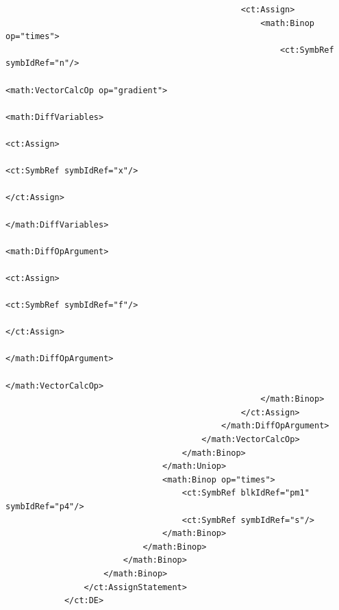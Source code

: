 \begin{lstlisting}
                                                <ct:Assign>
                                                    <math:Binop op="times">
                                                        <ct:SymbRef symbIdRef="n"/>
                                                        <math:VectorCalcOp op="gradient">
                                                            <math:DiffVariables>
                                                                <ct:Assign>
                                                                    <ct:SymbRef symbIdRef="x"/>
                                                                </ct:Assign>
                                                            </math:DiffVariables>
                                                            <math:DiffOpArgument>
                                                                <ct:Assign>
                                                                    <ct:SymbRef symbIdRef="f"/>
                                                                </ct:Assign>
                                                            </math:DiffOpArgument>
                                                        </math:VectorCalcOp>
                                                    </math:Binop>
                                                </ct:Assign>
                                            </math:DiffOpArgument>
                                        </math:VectorCalcOp>
                                    </math:Binop>
                                </math:Uniop>
                                <math:Binop op="times">
                                    <ct:SymbRef blkIdRef="pm1" symbIdRef="p4"/>
                                    <ct:SymbRef symbIdRef="s"/>
                                </math:Binop>
                            </math:Binop>
                        </math:Binop>
                    </math:Binop>
                </ct:AssignStatement>
            </ct:DE>
            

\end{lstlisting}
